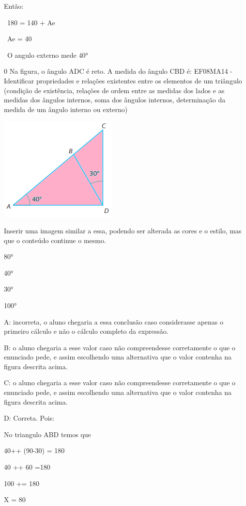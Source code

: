 Então:

~180 = 140 + Ae

~Ae = 40

~O angulo externo mede 40°

\num{0} Na figura, o ângulo ADC é reto. A medida do ângulo CBD é: EF08MA14 -
Identificar propriedades e relações existentes entre os elementos de um
triângulo (condição de existência, relações de ordem entre as medidas
dos lados e as medidas dos ângulos internos, soma dos ângulos internos,
determinação da medida de um ângulo interno ou externo)

\includegraphics[width=1\times 68333in,height=1\times 49462in]{./imgSAEB_8_MAT/media/image62.png}

Inserir uma imagem similar a essa, podendo ser alterada as cores e o
estilo, mas que o conteúdo continue o mesmo.

\item 80°
\item 40°
\item 30°
\item 100°

A: incorreta, o aluno chegaria a essa conclusão caso considerasse apenas
o primeiro cálculo e não o cálculo completo da expressão.

B: o aluno chegaria a esse valor caso não compreendesse corretamente o
que o enunciado pede, e assim escolhendo uma alternativa que o valor
contenha na figura descrita acima.

C: o aluno chegaria a esse valor caso não compreendesse corretamente o
que o enunciado pede, e assim escolhendo uma alternativa que o valor
contenha na figura descrita acima.

D: Correta. Pois:

No triangulo ABD temos que

40+\times + (90-30) = 180

40 +\times + 60 =180

100 +\times = 180

X = 80

